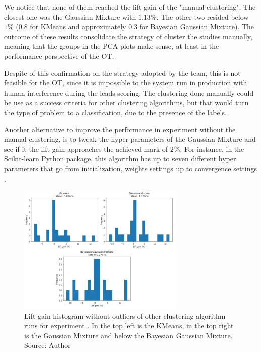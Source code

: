We notice that none of them reached the lift gain of the "manual clustering". The closest one was the Gaussian Mixture with $1.13\%$. The other two resided below $1\%$ ($0.8$ for KMeans and approximately $0.3$ for Bayesian Gaussian Mixture). The outcome of these results consolidate the strategy of cluster the studies manually, meaning that the groups in the PCA plots make sense, at least in the performance perspective of the OT. 

Despite of this confirmation on the strategy adopted by the team, this is not feasible for the OT, since it is impossible to the system run in production with human interference during the leads scoring. The clustering done manually could be use as a success criteria for other clustering algorithms, but that would turn the type of problem to a classification, due to the presence of the labels.

Another alternative to improve the performance in experiment \nameExperimentII{} without the manual clustering, is to tweak the hyper-parameters of the Gaussian Mixture and see if it the lift gain approaches the achieved mark of $2\%$. For instance, in the Scikit-learn Python package, this algorithm has up to seven different hyper parameters that go from initialization, weights settings up to convergence settings \cite{scikit-learn}.

\begin{figure}[h]
   \centering
   \includegraphics[width=8cm]{fig/ch4-other-cluster-algo.png}
   \caption{Lift gain histogram without outliers of other clustering algorithm runs for experiment \nameExperimentII{}. In the top left is the KMeans, in the top right is the Gaussian Mixture and below the Bayesian Gaussian Mixture. Source: Author}
   \label{fig:other-cluster-algo}
\end{figure}
 
